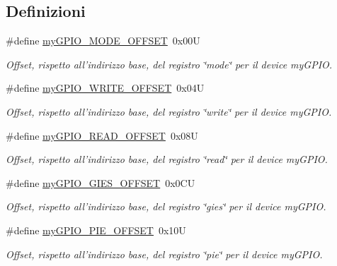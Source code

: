 \subsection*{Definizioni}
\begin{DoxyCompactItemize}
\item 
\#define \hyperlink{group__bare-metal_ga81a662103d6ed053978c0a9b4c273065}{my\+G\+P\+I\+O\+\_\+\+M\+O\+D\+E\+\_\+\+O\+F\+F\+S\+E\+T}~0x00\+U
\begin{DoxyCompactList}\small\item\em Offset, rispetto all'indirizzo base, del registro \char`\"{}mode\char`\"{} per il device my\+G\+P\+I\+O. \end{DoxyCompactList}\item 
\#define \hyperlink{group__bare-metal_ga2e45778b6ca9ce6f5768b3f7a4557ce1}{my\+G\+P\+I\+O\+\_\+\+W\+R\+I\+T\+E\+\_\+\+O\+F\+F\+S\+E\+T}~0x04\+U
\begin{DoxyCompactList}\small\item\em Offset, rispetto all'indirizzo base, del registro \char`\"{}write\char`\"{} per il device my\+G\+P\+I\+O. \end{DoxyCompactList}\item 
\#define \hyperlink{group__bare-metal_ga584d2dfece76e5762030d918d80592cc}{my\+G\+P\+I\+O\+\_\+\+R\+E\+A\+D\+\_\+\+O\+F\+F\+S\+E\+T}~0x08\+U
\begin{DoxyCompactList}\small\item\em Offset, rispetto all'indirizzo base, del registro \char`\"{}read\char`\"{} per il device my\+G\+P\+I\+O. \end{DoxyCompactList}\item 
\#define \hyperlink{group__bare-metal_gad251e4d87d464525d4a2858977468994}{my\+G\+P\+I\+O\+\_\+\+G\+I\+E\+S\+\_\+\+O\+F\+F\+S\+E\+T}~0x0\+C\+U
\begin{DoxyCompactList}\small\item\em Offset, rispetto all'indirizzo base, del registro \char`\"{}gies\char`\"{} per il device my\+G\+P\+I\+O. \end{DoxyCompactList}\item 
\#define \hyperlink{group__bare-metal_gaece3c1c9f504249d6b8ab060d8bb2738}{my\+G\+P\+I\+O\+\_\+\+P\+I\+E\+\_\+\+O\+F\+F\+S\+E\+T}~0x10\+U
\begin{DoxyCompactList}\small\item\em Offset, rispetto all'indirizzo base, del registro \char`\"{}pie\char`\"{} per il device my\+G\+P\+I\+O. \end{DoxyCompactList}\item 

\end{DoxyCompactItemize}
